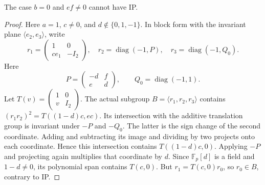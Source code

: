 \documentclass[11pt]{article}
\newcommand{\F}{\mathbb F}\newcommand{\PSL}{\operatorname{PSL}}
\begin{document}
\begin{lemma}\label{one-zero}
The case $b=0$ and $ef\ne0$ cannot have IP.
\end{lemma}
\begin{proof}
Here $a=1$, $c\ne0$, and $d\notin\{0,1,-1\}$. In block form with
the invariant plane $\langle e_2,e_3\rangle$, write
\[
 r_1=\begin{pmatrix}1&0\\c e_1&-I_2\end{pmatrix},\quad
 r_2=\operatorname{diag}(-1,P),\quad
 r_3=\operatorname{diag}(-1,Q_0).
\]
Here
\[
 P=\begin{pmatrix}-d&f\\e&d\end{pmatrix},\qquad
 Q_0=\operatorname{diag}(-1,1).
\]
Let $T(v)=\left(\begin{smallmatrix}1&0\\v&I_2\end{smallmatrix}\right)$.
The actual subgroup $B=\langle r_1,r_2,r_3\rangle$ contains
$(r_1r_2)^2=T((1-d)c,ec)$. Its intersection with the additive
translation group is invariant under $-P$ and $-Q_0$.
The latter is the sign change of the second coordinate. Adding and
subtracting its image and dividing by two projects onto each coordinate.
Hence this intersection contains $T((1-d)c,0)$. Applying $-P$ and
projecting again multiplies that coordinate by $d$. Since
$\F_p[d]$ is a field and $1-d\ne0$, its polynomial span contains
$T(c,0)$. But $r_1=T(c,0)r_0$, so $r_0\in B$, contrary to IP.
\end{proof}
\end{document}
